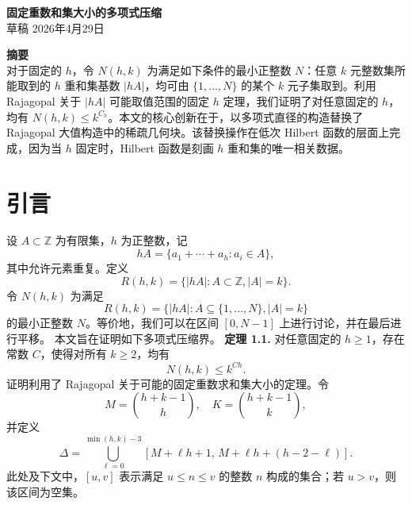 \documentclass[11pt]{article}
\theoremstyle{break}
\begin{document}
\begin{center}
\textbf{固定重数和集大小的多项式压缩} \\
\small 草稿 \quad 2026年4月29日
\end{center}
\noindent\textbf{摘要} \\
对于固定的 $h$，令 $N(h,k)$ 为满足如下条件的最小正整数 $N$：任意 $k$ 元整数集所能取到的 $h$ 重和集基数 $|hA|$，均可由 $\{1,\dots,N\}$ 的某个 $k$ 元子集取到。利用 Rajagopal 关于 $|hA|$ 可能取值范围的固定 $h$ 定理，我们证明了对任意固定的 $h$，均有 $N(h,k) \le k^{C_h}$。本文的核心创新在于，以多项式直径的构造替换了 Rajagopal 大值构造中的稀疏几何块。该替换操作在低次 Hilbert 函数的层面上完成，因为当 $h$ 固定时，Hilbert 函数是刻画 $h$ 重和集的唯一相关数据。
\section{引言}
设 $A \subset \mathbb{Z}$ 为有限集，$h$ 为正整数，记
\[
hA = \{a_1 + \cdots + a_h : a_i \in A\},
\]
其中允许元素重复。定义
\[
R(h,k) = \{|hA| : A \subset \mathbb{Z}, |A| = k\}.
\]
令 $N(h,k)$ 为满足
\[
R(h,k) = \{|hA| : A \subseteq \{1,\dots,N\}, |A| = k\}
\]
的最小正整数 $N$。等价地，我们可以在区间 $[0, N-1]$ 上进行讨论，并在最后进行平移。
本文旨在证明如下多项式压缩界。
\textbf{定理 1.1.}
对任意固定的 $h \ge 1$，存在常数 $C$，使得对所有 $k \ge 2$，均有
\[ N(h,k) \le k^{Ch}. \]
证明利用了 Rajagopal 关于可能的固定重数求和集大小的定理。令
\[ M = \binom{h+k-1}{h}, \quad K = \binom{h+k-1}{k}, \]
并定义
\[ \Delta = \bigcup_{\ell=0}^{\min(h,k)-3} \left[ M + \ell h + 1, \, M + \ell h + (h-2-\ell) \right]. \]
此处及下文中，$[u,v]$ 表示满足 $u \le n \le v$ 的整数 $n$ 构成的集合；若 $u > v$，则该区间为空集。
\end{document}
